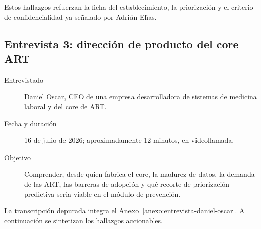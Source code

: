 Estos hallazgos refuerzan la ficha del establecimiento, la priorizaci\'on y el criterio de confidencialidad ya se\~nalado por Adri\'an El\'{\i}as.

\subsection{Entrevista 3: direcci\'on de producto del core ART}

\begin{description}
	\item[Entrevistado] Daniel Oscar, CEO de una empresa desarrolladora de sistemas de medicina laboral y del core de ART.
	\item[Fecha y duraci\'on] 16 de julio de 2026; aproximadamente 12 minutos, en videollamada.
	\item[Objetivo] Comprender, desde quien fabrica el core, la madurez de datos, la demanda de las ART, las barreras de adopci\'on y qu\'e recorte de priorizaci\'on predictiva ser\'{\i}a viable en el m\'odulo de prevenci\'on.
\end{description}

La transcripci\'on depurada integra el Anexo~\ref{anexo:entrevista-daniel-oscar}. A continuaci\'on se sintetizan los hallazgos accionables.

